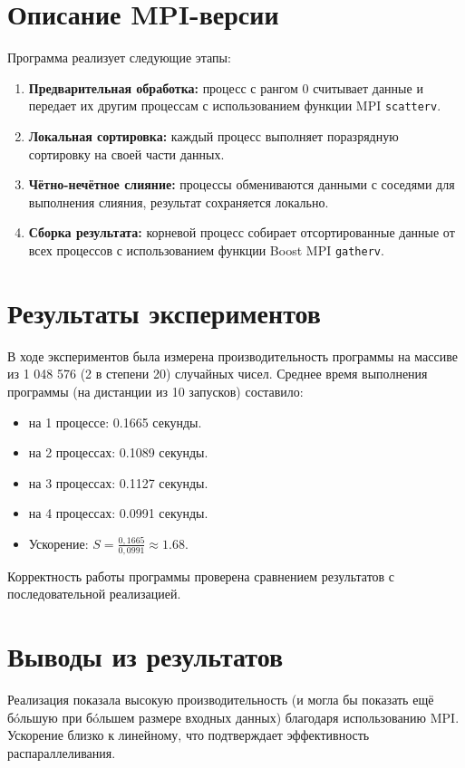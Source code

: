 ﻿\documentclass[a4paper,12pt]{article}
\begin{document}
\section*{Описание MPI-версии}
Программа реализует следующие этапы:
\begin{enumerate}
    \item \textbf{Предварительная обработка:} процесс с рангом 0 считывает данные и передает их другим процессам с использованием функции MPI \texttt{scatterv}.
    \item \textbf{Локальная сортировка:} каждый процесс выполняет поразрядную сортировку на своей части данных.
    \item \textbf{Чётно-нечётное слияние:} процессы обмениваются данными с соседями для выполнения слияния, результат сохраняется локально.
    \item \textbf{Сборка результата:} корневой процесс собирает отсортированные данные от всех процессов с использованием функции Boost MPI \texttt{gatherv}.
\end{enumerate}

\section*{Результаты экспериментов}
В ходе экспериментов была измерена производительность программы на массиве из 1 048 576 (2 в степени 20) случайных чисел. Среднее время выполнения программы (на дистанции из 10 запусков) составило:
\begin{itemize}
    \item на 1 процессе: 0.1665 секунды.
    \item на 2 процессах: 0.1089 секунды.
    \item на 3 процессах: 0.1127 секунды.
    \item на 4 процессах: 0.0991 секунды.
    \item Ускорение: $S = \frac{0,1665}{0,0991} \approx 1.68$.
\end{itemize}

Корректность работы программы проверена сравнением результатов с последовательной реализацией.

\section*{Выводы из результатов}
Реализация показала высокую производительность (и могла бы показать ещё бóльшую при бóльшем размере входных данных) благодаря использованию MPI. Ускорение близко к линейному, что подтверждает эффективность распараллеливания.
\end{document}
